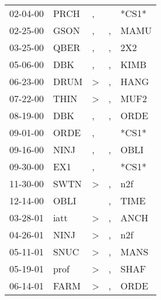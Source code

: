 \begin{supertabular}{p{0.07\textwidth}p{0.06\textwidth}p{0.02\textwidth}p{0.02\textwidth}p{0.06\textwidth}}
 02-04-00\textsuperscript{} &  PRCH\textsuperscript{} &                , &    &                            *CS1* \\
 02-25-00\textsuperscript{} &  GSON\textsuperscript{} &                , &  , &           MAMU\textsuperscript{} \\
 03-25-00\textsuperscript{} &  QBER\textsuperscript{} &                , &  , &            2X2\textsuperscript{} \\
 05-06-00\textsuperscript{} &   DBK\textsuperscript{} &                , &  , &           KIMB\textsuperscript{} \\
 06-23-00\textsuperscript{} &  DRUM\textsuperscript{} &     \textgreater &  , &           HANG\textsuperscript{} \\
 07-22-00\textsuperscript{} &  THIN\textsuperscript{} &     \textgreater &  , &           MUF2\textsuperscript{} \\
 08-19-00\textsuperscript{} &   DBK\textsuperscript{} &                , &  , &           ORDE\textsuperscript{} \\
 09-01-00\textsuperscript{} &  ORDE\textsuperscript{} &                , &    &                            *CS1* \\
 09-16-00\textsuperscript{} &  NINJ\textsuperscript{} &                , &  , &           OBLI\textsuperscript{} \\
 09-30-00\textsuperscript{} &   EX1\textsuperscript{} &                , &    &                            *CS1* \\
 11-30-00\textsuperscript{} &  SWTN\textsuperscript{} &     \textgreater &  , &            n2f\textsuperscript{} \\
 12-14-00\textsuperscript{} &  OBLI\textsuperscript{} &                  &  , &           TIME\textsuperscript{} \\
 03-28-01\textsuperscript{} &  iatt\textsuperscript{} &     \textgreater &  , &           ANCH\textsuperscript{} \\
 04-26-01\textsuperscript{} &  NINJ\textsuperscript{} &     \textgreater &  , &            n2f\textsuperscript{} \\
 05-11-01\textsuperscript{} &  SNUC\textsuperscript{} &     \textgreater &  , &           MANS\textsuperscript{} \\
 05-19-01\textsuperscript{} &  prof\textsuperscript{} &     \textgreater &  , &           SHAF\textsuperscript{} \\
 06-14-01\textsuperscript{} &  FARM\textsuperscript{} &     \textgreater &  , &           ORDE\textsuperscript{} \\

\end{supertabular}
